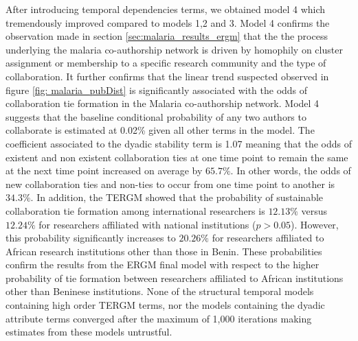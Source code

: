 After introducing temporal dependencies terms, we obtained model 4 which tremendously improved compared to models 1,2 and 3. Model 4 confirms the observation made in section \ref{sec:malaria_results_ergm} that the  the process underlying the malaria co-authorship network is driven by homophily on cluster assignment or membership to a specific research community and the type of collaboration. It further confirms that the linear trend suspected observed in figure \ref{fig: malaria_pubDist} is significantly associated with the odds of collaboration tie formation in the Malaria co-authorship network. Model 4 suggests that the baseline conditional probability of any two authors to collaborate is estimated at 0.02\% given all other terms in the model. The coefficient associated to the dyadic stability term is 1.07 meaning that the odds of existent and non existent collaboration ties at one time point to remain the same at the next time point increased on average by $65.7\%$. In other words, the odds of new collaboration ties and non-ties to occur from one time point to another is $34.3\%$. In addition, the TERGM showed that the probability of sustainable collaboration tie formation among international researchers is $12.13\%$ versus $12.24\%$ for researchers affiliated with national institutions ($p>0.05$). However, this probability significantly increases to $20.26\%$ for researchers affiliated to African research institutions other than those in Benin. These probabilities confirm the results from the ERGM final model with respect to the higher probability of tie formation between researchers affiliated to African institutions other than Beninese institutions. None of the structural temporal models containing high order TERGM terms, nor the models containing the dyadic attribute terms converged after the maximum of 1,000 iterations making estimates from these models untrustful.

